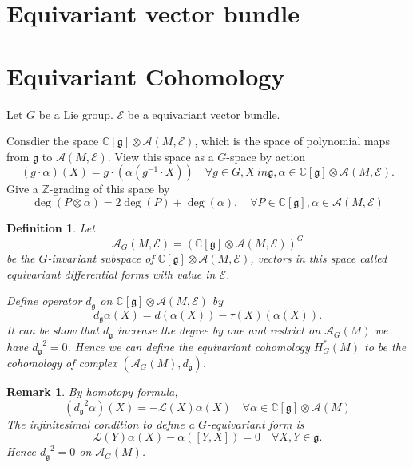 \documentclass[11pt]{amsart}
\newtheorem{Def}[Thm]{Definition}
\newtheorem{Rmk}[Thm]{Remark}
\def\cA{{\mathcal{A}}}
\def\cAg{{\mathcal{A}_G}}
\def\cL{{\mathcal{L}}}
\def\cE{{\mathcal{E}}}
\def\bC{{\mathbb{C}}}
\def\fgg{{\mathfrak{g}}}
\def\bZ{{\mathbb{Z}}}
\def\dg{{d_{\fgg}}}
\begin{document}
\section{Equivariant vector bundle}


\section{Equivariant Cohomology}
Let $G$ be a Lie group. 
$\cE$ be a equivariant vector bundle. 

Consdier the space $\bC[\fgg]\otimes \cA(M,\cE)$, which is the space of polynomial maps from $\fgg$ to $\cA(M,\cE)$. View this space as a $G$-space by action
\[
(g\cdot \alpha)(X) = g\cdot (\alpha (g^{-1}\cdot X)) \quad \forall g\in G,
X\ in \fgg, \alpha \in \bC[\fgg]\otimes \cA(M,\cE).
\]
Give a $\bZ$-grading of this space by 
\[
\deg(P\otimes \alpha) = 2\deg(P)+\deg(\alpha), 
\quad \forall P\in \bC[\fgg], \alpha \in \cA(M,\cE)
\]

\begin{Def}
Let 
\[
\cA_G(M,\cE) = \left(\bC[\fgg]\otimes \cA(M,\cE)\right)^G
\]
be the $G$-invariant subspace of $\bC[\fgg]\otimes \cA(M,\cE)$, vectors in this space called equivariant differential forms with value in $\cE$.

Define operator $\dg$ on $\bC[\fgg]\otimes \cA(M,\cE)$ by
\[
\dg \alpha(X) = d(\alpha(X)) - \tau(X)(\alpha(X)).
\]
It can be show that $\dg$ increase the degree by one and restrict on 
$\cAg(M)$ we have $\dg^2= 0$. Hence we can define
the equivariant cohomology $H_G^*(M)$ to be the cohomology of complex $\left(\cAg(M),\dg\right)$.
\end{Def}

\begin{Rmk}
By homotopy formula,
\[
(\dg^2 \alpha)(X) = - \cL(X)\alpha(X)\quad \forall \alpha
\in \bC[\fgg]\otimes \cA(M)
\]
The infinitesimal condition to define a $G$-equivariant form is 
\[
\cL(Y)\alpha(X) - \alpha([Y,X]) = 0 \quad \forall X,Y \in \fgg.
\]
Hence $\dg^2 = 0$ on $\cAg(M)$.
\end{Rmk}
\end{document}
